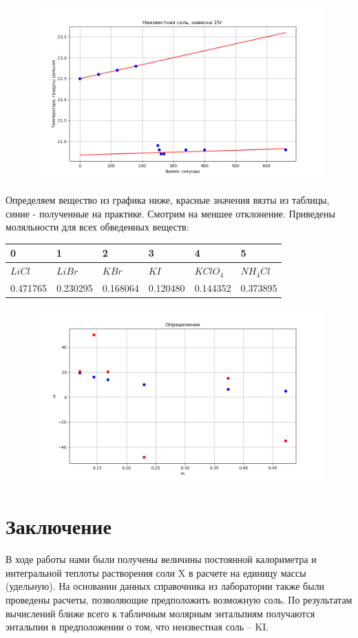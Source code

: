 \documentclass[a4paper, 12pt]{article}
\begin{document}
\begin{figure}[h!]
    \centering
    \includegraphics[width=150mm]{./pictures/u2.png}
    \caption{}
\end{figure}
Определяем вещество из графика ниже, красные значения вязты из таблицы, синие - полученные на практике.  
Смотрим на меншее отклонение.
Приведены моляльности для всех обведенных веществ:
\begin{table}
    \centering
    \begin{tabular}{llllll}
        \toprule
        0 & 1 & 2 & 3 & 4 & 5 \\
        \midrule
        $LiCl$ & $LiBr$ & $KBr$ & $KI$ & $KClO_4$ & $NH_4Cl$ \\
        0.471765 & 0.230295 & 0.168064 & 0.120480 & 0.144352 & 0.373895 \\
        \bottomrule
        \end{tabular}
\end{table}
\centering
\begin{figure}[h!]
    \centering
    \includegraphics[width=150mm]{./pictures/uuu.png}
    \caption{}
\end{figure}

\section{Заключение}
В ходе работы нами были получены величины постоянной калориметра и интегральной теплоты растворения соли X в расчете на единицу массы (удельную). На основании данных справочника из лаборатории также были проведены расчеты, позволяющие предположить возможную соль.
По результатам вычислений ближе всего к табличным молярным энтальпиям получаются энтальпии в предположении о том, что неизвестная соль
 -- KI.
\end{document}
